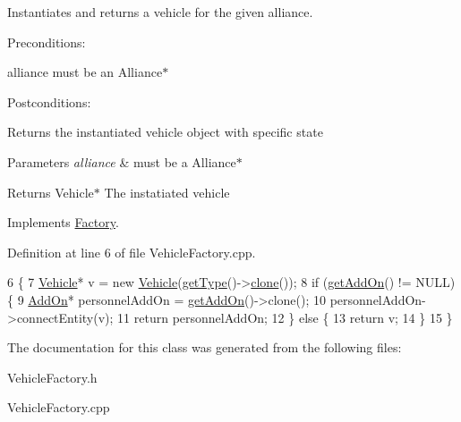 Instantiates and returns a vehicle for the given alliance. 

Preconditions\+:
\begin{DoxyItemize}
\item alliance must be an Alliance$\ast$
\end{DoxyItemize}

Postconditions\+:
\begin{DoxyItemize}
\item Returns the instantiated vehicle object with specific state
\end{DoxyItemize}


\begin{DoxyParams}{Parameters}
{\em alliance} & must be a Alliance$\ast$ \\
\hline
\end{DoxyParams}
\begin{DoxyReturn}{Returns}
Vehicle$\ast$ The instatiated vehicle 
\end{DoxyReturn}


Implements \hyperlink{classFactory}{Factory}.



Definition at line 6 of file Vehicle\+Factory.\+cpp.


\begin{DoxyCode}
6                                                        \{
7     \hyperlink{classVehicle}{Vehicle}* v = \textcolor{keyword}{new} \hyperlink{classVehicle}{Vehicle}(\hyperlink{classFactory_ac91051006ace7ec5bb6ecf0fe6d02d58}{getType}()->\hyperlink{classVehicleFactory_a6d874e37b573b491a49e303209ac42cd}{clone}());
8     \textcolor{keywordflow}{if} (\hyperlink{classFactory_a994153930f59cafb280e91d5b100b5aa}{getAddOn}() != NULL) \{
9         \hyperlink{classAddOn}{AddOn}* personnelAddOn = \hyperlink{classFactory_a994153930f59cafb280e91d5b100b5aa}{getAddOn}()->clone();
10         personnelAddOn->connectEntity(v);
11         \textcolor{keywordflow}{return} personnelAddOn;
12     \} \textcolor{keywordflow}{else} \{
13         \textcolor{keywordflow}{return} v;
14     \}
15 \}
\end{DoxyCode}


The documentation for this class was generated from the following files\+:\begin{DoxyCompactItemize}
\item 
Vehicle\+Factory.\+h\item 
Vehicle\+Factory.\+cpp\end{DoxyCompactItemize}
